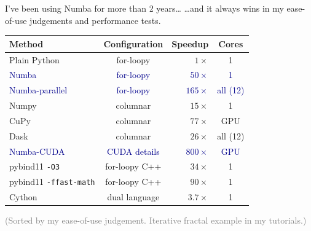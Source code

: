 \documentclass[aspectratio=169]{beamer}
\begin{document}
\begin{frame}{I've been using Numba for more than 2 years\ldots}
\vspace{0.5 cm}
{\large \ldots and it always wins in my ease-of-use judgements and performance tests.}

\begin{center}
\begin{tabular}{l c r c}
{\bf Method}               & {\bf Configuration} & {\bf Speedup} & {\bf Cores} \\\hline
Plain Python               & for-loopy           &     $1\times$ & 1 \\
\textcolor{darkblue}{Numba}                      & \textcolor{darkblue}{for-loopy}           &    \textcolor{darkblue}{$50\times$} & \textcolor{darkblue}{1} \\
\textcolor{darkblue}{Numba-parallel}             & \textcolor{darkblue}{for-loopy}           &   \textcolor{darkblue}{$165\times$} & \textcolor{darkblue}{all (12)} \\
Numpy                      & columnar            &    $15\times$ & 1 \\
CuPy                       & columnar            &    $77\times$ & GPU \\
Dask                       & columnar            &    $26\times$ & all (12) \\
\textcolor{darkblue}{Numba-CUDA}                 & \textcolor{darkblue}{CUDA details}        &   \textcolor{darkblue}{$800\times$} & \textcolor{darkblue}{GPU} \\
pybind11 {\tt -O3}         & for-loopy C++       &    $34\times$ & 1 \\
pybind11 {\tt -ffast-math} & for-loopy C++       &    $90\times$ & 1 \\
Cython                     & dual language       &   $3.7\times$ & 1 \\
\end{tabular}
\end{center}

\textcolor{gray}{(Sorted by my ease-of-use judgement. Iterative fractal example in my tutorials.)}
\end{frame}
\end{document}
